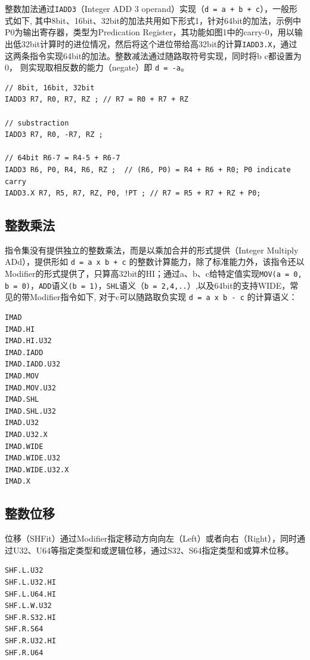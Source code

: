 整数加法通过\lstinline|IADD3|（Integer ADD 3 operand）实现（\lstinline|d = a + b + c|），一般形式如下, 其中8bit、16bit、32bit的加法共用如下形式1，针对64bit的加法，示例中P0为输出寄存器，类型为Predication Register，其功能如图1中的carry-0，用以输出低32bit计算时的进位情况，然后将这个进位带给高32bit的计算\lstinline|IADD3.X|，通过这两条指令实现64bit的加法。整数减法通过随路取符号实现，同时将b c都设置为0， 则实现取相反数的能力（negate）即 \lstinline|d = -a|。

\begin{lstlisting}
// 8bit, 16bit, 32bit
IADD3 R7, R0, R7, RZ ; // R7 = R0 + R7 + RZ

// substraction
IADD3 R7, R0, -R7, RZ ;

// 64bit R6-7 = R4-5 + R6-7
IADD3 R6, P0, R4, R6, RZ ;  // (R6, P0) = R4 + R6 + R0; P0 indicate carry
IADD3.X R7, R5, R7, RZ, P0, !PT ; // R7 = R5 + R7 + RZ + P0;
\end{lstlisting}

\subsection{整数乘法}

指令集没有提供独立的整数乘法，而是以乘加合并的形式提供（Integer Multiply ADd），提供形如 \lstinline|d = a x b + c| 的整数计算能力，除了标准能力外，该指令还以Modifier的形式提供了，只算高32bit的HI；通过a、b、c给特定值实现\lstinline|MOV(a = 0, b = 0)|，\lstinline|ADD|语义\lstinline|(b = 1)|，\lstinline|SHL|语义（\lstinline|b = 2,4,..|）,以及64bit的支持WIDE，常见的带Modifier指令如下, 对于c可以随路取负实现 \lstinline|d = a x b - c| 的计算语义：

\begin{lstlisting}
IMAD
IMAD.HI
IMAD.HI.U32
IMAD.IADD
IMAD.IADD.U32
IMAD.MOV
IMAD.MOV.U32
IMAD.SHL
IMAD.SHL.U32
IMAD.U32
IMAD.U32.X
IMAD.WIDE
IMAD.WIDE.U32
IMAD.WIDE.U32.X
IMAD.X
\end{lstlisting}

\subsection{整数位移}

位移（SHFit）通过Modifier指定移动方向向左（Left）或者向右（Right），同时通过U32、U64等指定类型和或逻辑位移，通过S32、S64指定类型和或算术位移。

\begin{lstlisting}
SHF.L.U32
SHF.L.U32.HI
SHF.L.U64.HI
SHF.L.W.U32
SHF.R.S32.HI
SHF.R.S64
SHF.R.U32.HI
SHF.R.U64
\end{lstlisting}

